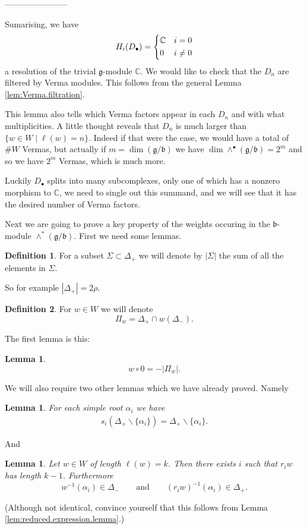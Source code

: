 \documentclass[12pt]{article}
\theoremstyle{plain}
\newtheorem{lemma}[thm]{Lemma}
\theoremstyle{definition}
\newtheorem{defn}{Definition}[section]
\numberwithin{equation}{section}
\newcommand{\al}{\alpha}
\newcommand{\D}{\Delta}
\newcommand{\C}{\mathbb{C}}
\newcommand{\g}{\mathfrak{g}}
\newcommand{\fb}{\mathfrak{b}}
\begin{document}
-----------------------

Sumarising, we have
\begin{align*}
H_i(D_\bullet) = \begin{dcases}
\C & i=0 \\
0 & i \neq 0
\end{dcases}
\end{align*}
a resolution of the trivial $\g$-module $\C$. We would like to check that the $D_n$ are filtered by Verma modules. This follows from the general Lemma \ref{lem:Verma.filtration}.

This lemma also tells which Verma factors appear in each $D_n$ and with what multiplicities. A little thought reveals that $D_n$ is much larger than $\{w \in W \mid \ell(w) = n\}$. Indeed if that were the case, we would have a total of $\# W$ Vermas, but actually if $m = \dim(\g/\fb)$ we have $\dim \wedge^\bullet(\g/\fb) = 2^m$ and so we have $2^m$ Vermas, which is much more.

Luckily $D_\bullet$ splits into many subcomplexes, only one of which has a nonzero morphism to $\C$, we need to single out this summand, and we will see that it has the desired number of Verma factors.

{\color{red}
Next we are going to prove a key property of the weights occuring in the $\fb$-module $\wedge^*(\g/\fb)$. First we need some lemmas.

\begin{defn}
For a subset $\Sigma \subset \D_+$ we will denote by $|\Sigma|$ the sum of all the elements in $\Sigma$.
\end{defn}
So for example $|\D_+| = 2\rho$.

\begin{defn}
For $w \in W$ we will denote
\[
\Pi_w = \D_+ \cap w(\D_-).
\]
\end{defn}
The first lemma is this:
\begin{lemma}\label{lem:w.0}
\[
w \circ 0 = -|\Pi_w|.
\]
\end{lemma}


We will also require two other lemmas which we have already proved. Namely
\begin{lemma}
For each simple root $\al_i$ we have
\begin{align*}
s_i(\D_+ \backslash \{\al_i\}) = \D_+ \backslash \{\al_i\}.
\end{align*}
\end{lemma}
And
\begin{lemma}
Let $w \in W$ of length $\ell(w) = k$. Then there exists $i$ such that $r_i w$ has length $k-1$. Furthermore
\[
w^{-1}(\al_i) \in \D_- \qquad \text{and} \qquad (r_iw)^{-1}(\al_i) \in \D_+.
\]
\end{lemma}
(Although not identical, convince yourself that this follows from Lemma \ref{lem:reduced.expression.lemma}.)
}
\end{document}
